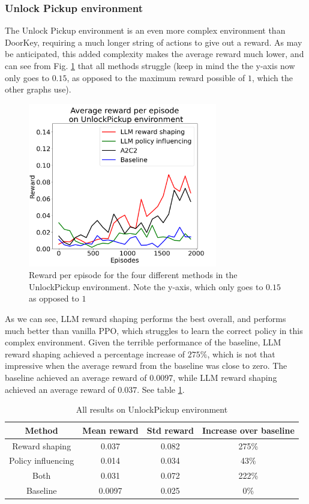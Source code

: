 \documentclass[conference]{IEEEtran}
\begin{document}
\subsubsection{Unlock Pickup environment}

The Unlock Pickup environment is an even more complex environment than DoorKey, requiring a much longer string of actions to give out a reward. As may be anticipated, this added complexity makes the average reward much lower, and can see from Fig. \ref{unlockpickupresults} that all methods struggle (keep in mind the the y-axis now only goes to $0.15$, as opposed to the maximum reward possible of $1$, which the other graphs use).

\begin{figure}[h]
\centerline{\includegraphics[width=3.25in]{figure/unlockpickupresults.png}}
\caption{Reward per episode for the four different methods in the UnlockPickup environment. Note the y-axis, which only goes to $0.15$ as opposed to $1$}
\label{unlockpickupresults}
\end{figure}

As we can see, LLM reward shaping performs the best overall, and performs much better than vanilla PPO, which struggles to learn the correct policy in this complex environment. Given the terrible performance of the baseline, LLM reward shaping achieved a percentage increase of $275\%$, which is not that impressive when the average reward from the baseline was close to zero. The baseline achieved an average reward of $0.0097$, while LLM reward shaping achieved an average reward of $0.037$. See table \ref{unlockpickuptable}.

\begin{table}[h]
\caption{All results on UnlockPickup environment}
\begin{center}
\label{unlockpickuptable}
\begin{tabular}{c | c c c}
Method & Mean reward & Std reward & Increase over baseline \\
\hline
Reward shaping & 0.037 & 0.082 & 275\% \\
Policy influencing & 0.014 & 0.034 & 43\% \\
Both & 0.031 & 0.072 & 222\% \\
Baseline & 0.0097 & 0.025 & 0\% \\
\end{tabular}
\end{center}
\end{table}
\end{document}
